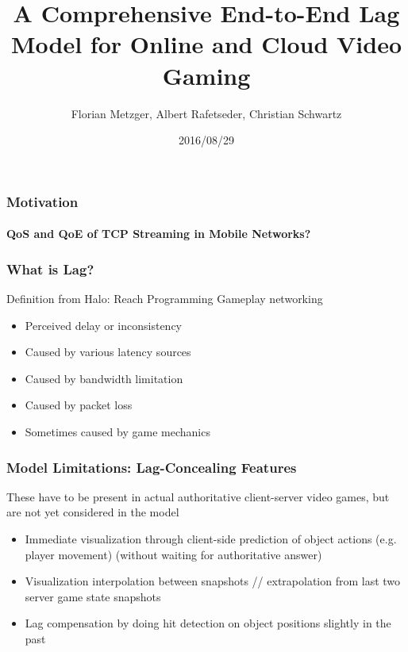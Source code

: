 \documentclass{UDEbeamerEN}
\title{A Comprehensive End-to-End Lag Model for Online and Cloud Video Gaming}
\author{Florian Metzger, Albert Rafetseder, Christian Schwartz}
\date[]{2016/08/29}
\def\Put(#1,#2)#3{\leavevmode\makebox(0,0){\put(#1,#2){#3}}}
\begin{document}
\frame{\titlepage}




\begin{frame}
	\frametitle{Motivation}
	\framesubtitle{QoS and QoE of TCP Streaming in Mobile Networks?}
	\vspace{-0.5cm}


\end{frame}

\begin{frame}
	\frametitle{What is Lag?}
		Definition from Halo: Reach Programming Gameplay networking
	\begin{itemize}
		\item Perceived delay or inconsistency
		\item Caused by various latency sources
		\item Caused by bandwidth limitation
		\item Caused by packet loss
		\item Sometimes  caused by game mechanics
	\end{itemize}
\end{frame}

\begin{frame}
	\frametitle{Model Limitations: Lag-Concealing Features}
		These have to be present in actual authoritative client-server video games, but are not yet considered in the model
	\begin{itemize}
		\item Immediate visualization through client-side prediction of object actions (e.g. player movement) (without waiting for authoritative answer)
		\item Visualization interpolation between snapshots // extrapolation from last two server game state snapshots
		\item Lag compensation by doing hit detection on object positions slightly in the past
	\end{itemize}
\end{frame}
\end{document}
